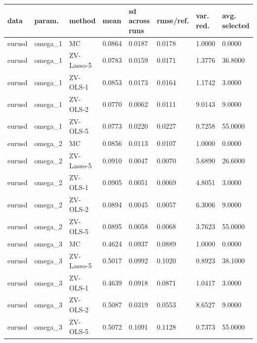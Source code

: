 \begin{tabular}{llllllll}
\toprule
data & param. & method & mean & sd across runs & rmse/ref. & var. red. & avg. selected \\
\midrule
eurusd & omega\_1 & MC & 0.0864 & 0.0187 & 0.0178 & 1.0000 & 0.0000 \\
eurusd & omega\_1 & ZV-Lasso-5 & 0.0783 & 0.0159 & 0.0171 & 1.3776 & 36.8000 \\
eurusd & omega\_1 & ZV-OLS-1 & 0.0853 & 0.0173 & 0.0164 & 1.1742 & 3.0000 \\
eurusd & omega\_1 & ZV-OLS-2 & 0.0770 & 0.0062 & 0.0111 & 9.0143 & 9.0000 \\
eurusd & omega\_1 & ZV-OLS-5 & 0.0773 & 0.0220 & 0.0227 & 0.7258 & 55.0000 \\
eurusd & omega\_2 & MC & 0.0856 & 0.0113 & 0.0107 & 1.0000 & 0.0000 \\
eurusd & omega\_2 & ZV-Lasso-5 & 0.0910 & 0.0047 & 0.0070 & 5.6890 & 26.6000 \\
eurusd & omega\_2 & ZV-OLS-1 & 0.0905 & 0.0051 & 0.0069 & 4.8051 & 3.0000 \\
eurusd & omega\_2 & ZV-OLS-2 & 0.0894 & 0.0045 & 0.0057 & 6.3006 & 9.0000 \\
eurusd & omega\_2 & ZV-OLS-5 & 0.0895 & 0.0058 & 0.0068 & 3.7623 & 55.0000 \\
eurusd & omega\_3 & MC & 0.4624 & 0.0937 & 0.0889 & 1.0000 & 0.0000 \\
eurusd & omega\_3 & ZV-Lasso-5 & 0.5017 & 0.0992 & 0.1020 & 0.8923 & 38.1000 \\
eurusd & omega\_3 & ZV-OLS-1 & 0.4639 & 0.0918 & 0.0871 & 1.0417 & 3.0000 \\
eurusd & omega\_3 & ZV-OLS-2 & 0.5087 & 0.0319 & 0.0553 & 8.6527 & 9.0000 \\
eurusd & omega\_3 & ZV-OLS-5 & 0.5072 & 0.1091 & 0.1128 & 0.7373 & 55.0000 \\
\bottomrule
\end{tabular}
